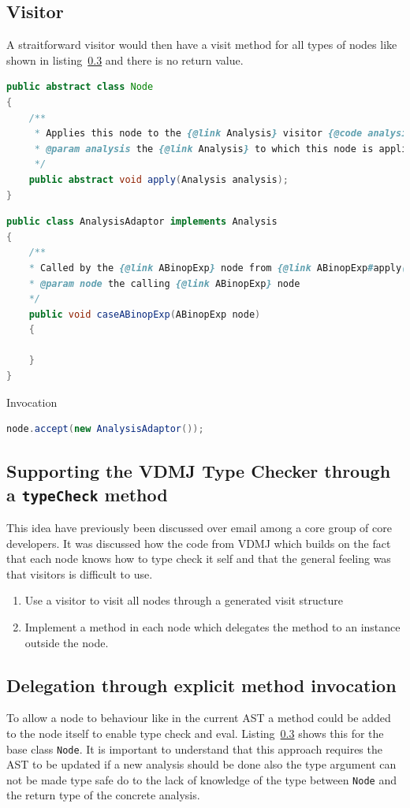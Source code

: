 \documentclass{overturerep}
\begin{document}
\subsection{Visitor}
A straitforward visitor would then have a visit method for all types of nodes like shown in listing~\ref{} and there is no return value.
\lstset{tabsize=2,frame=single}

\begin{lstlisting}[language=java]
public abstract class Node
{
	/**
	 * Applies this node to the {@link Analysis} visitor {@code analysis}.
	 * @param analysis the {@link Analysis} to which this node is applied
	 */
	public abstract void apply(Analysis analysis);
}
\end{lstlisting}

\begin{lstlisting}[language=java]
public class AnalysisAdaptor implements Analysis
{
	/**
	* Called by the {@link ABinopExp} node from {@link ABinopExp#apply(Switch)}.
	* @param node the calling {@link ABinopExp} node
	*/
	public void caseABinopExp(ABinopExp node)
	{

	}
}
\end{lstlisting}

Invocation
\begin{lstlisting}[language=java]
node.accept(new AnalysisAdaptor());
\end{lstlisting}

\subsection{Supporting the VDMJ Type Checker through a \texttt{typeCheck} method}
This idea have previously been discussed over email among a core group
of core developers. It was discussed how the code from VDMJ which builds on the fact that each node knows how to type check it self and that the general feeling was that visitors is difficult to use.
\begin{enumerate}
\item Use a visitor to visit all nodes through a generated visit structure
\item Implement a method in each node which delegates the method to an instance outside the node.
\end{enumerate}

\subsection{Delegation through explicit method invocation}
To allow a node to behaviour like in the current AST a method could be added to the node itself to enable type check and eval. Listing~\ref{} shows this for the base class \texttt{Node}. It is important to understand that this approach requires the AST to be updated if a new analysis should be done also the type argument can not be made type safe do to the lack of knowledge of the type between \texttt{Node} and the return type of the concrete analysis.
\end{document}
